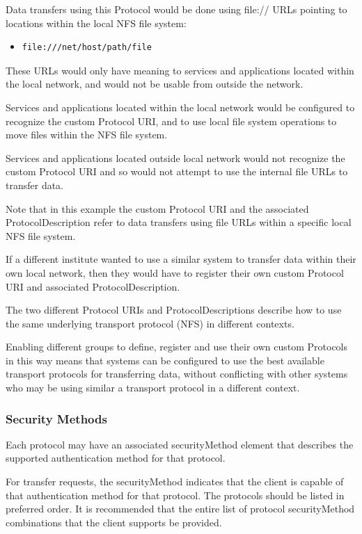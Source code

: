 \documentclass[11pt,a4paper]{ivoa}
\begin{document}
Data transfers using this Protocol would be done using file:// URLs pointing to locations within the local NFS file system:

\begin{itemize}
    \item \begin{verbatim}file:///net/host/path/file\end{verbatim}
\end{itemize}

These URLs would only have meaning to services and applications located within the local network, and would not be usable from outside the network.

Services and applications located within the local network would be configured to recognize the custom Protocol URI, and to use local file system operations to move files within the NFS file system.

Services and applications located outside local network would not recognize the custom Protocol URI and so would not attempt to use the internal file URLs to transfer data.

Note that in this example the custom Protocol URI and the associated ProtocolDescription refer to data transfers using file URLs within a specific local NFS file system.

If a different institute wanted to use a similar system to transfer data within their own local network, then they would have to register their own custom Protocol URI and associated ProtocolDescription.

The two different Protocol URIs and ProtocolDescriptions describe how to use the same underlying transport protocol (NFS) in different contexts.

Enabling different groups to define, register and use their own custom Protocols in this way means that systems can be configured to use the best available transport protocols for transferring data, without conflicting with other systems who may be using similar a transport protocol in a different context.

\subsubsection{Security Methods}
Each protocol may have an associated securityMethod element that describes the supported authentication method for that protocol.

For transfer requests, the securityMethod indicates that the client is capable of that authentication method for that protocol.  The protocols should be listed in preferred order.  It is recommended that the entire list of protocol securityMethod combinations that the client supports be provided.
\end{document}
